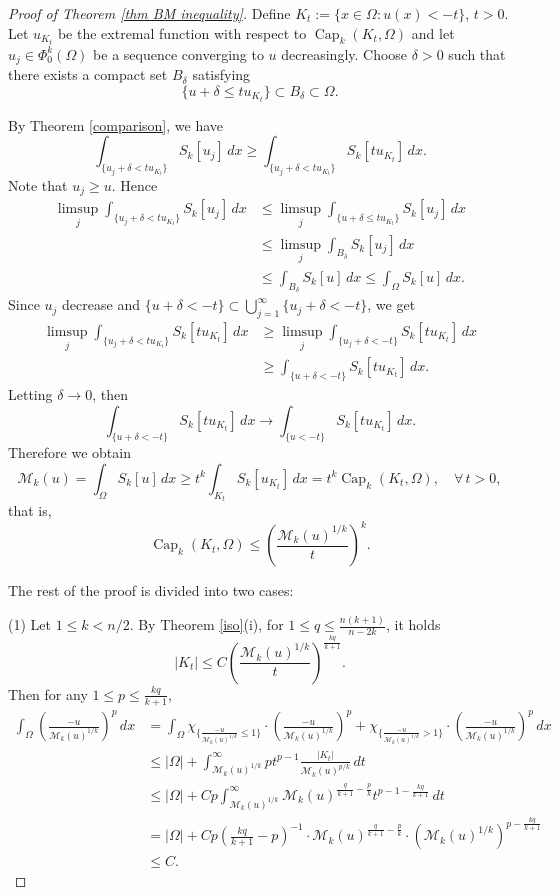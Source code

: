 \documentclass[11pt]{amsart}
\numberwithin{equation}{section}
\numberwithin{equation}{section}
\begin{document}
\begin{proof} [Proof of Theorem \ref{thm BM inequality}] 
	Define $K_{t}:=\{x\in \Omega : u(x)<-t\}$, $t>0$.  Let $u_{K_t}$ be the extremal function with respect to $\operatorname{Cap}_{k}(K_{t},\Omega)$ and let $u_j \in \Phi_0^k(\Omega)$ be a sequence converging to $u$ decreasingly. Choose $\delta>0$ such that there exists a compact set $B_{\delta}$ satisfying 
	\[\{u+\delta \le tu_{K_t}\}\subset B_{\delta}\subset \Omega.\]
	
	By Theorem \ref{comparison}, we have
	\[
	\int_{\{u_j+\delta<tu_{K_t}\}}S_k[u_j]\,dx\geq \int_{\{u_j+\delta<tu_{K_t}\}}S_k[tu_{K_{t}}]\,dx.
	\]
	Note that $u_j\ge u$. Hence
	\begin{align*}
		\limsup_j	\int_{\{u_j+\delta<tu_{K_t}\}}S_k[u_j]\,dx
		&\le \limsup_j\int_{\{u+\delta\le tu_{K_t}\}}S_k[u_j]\,dx\\
		&\le  \limsup_j\int_{B_\delta}S_k[u_j]\,dx\\
		&\le \int_{B_\delta}S_k[u]\,dx\le \int_{\Omega}S_k[u]\,dx.
	\end{align*}
	Since $u_j$ decrease and $\{u+\delta<-t\}\subset \bigcup_{j=1}^{\infty}\{u_j+\delta<-t\}$,  we get
	\begin{align*}
		\limsup_j\int_{\{u_j+\delta<tu_{K_t}\}}S_k[tu_{K_{t}}]\,dx
		&\ge  \limsup_j\int_{\{u_j+\delta<-t\}}S_k[tu_{K_{t}}]\,dx\\
		&\ge \int_{\{u+\delta<-t\}}S_k[tu_{K_{t}}]\,dx.
	\end{align*}
	Letting $\delta\to 0$, then 
	\[\int_{\{u+\delta<-t\}}S_k[tu_{K_{t}}]\,dx \to \int_{\{u<-t\}}S_k[tu_{K_{t}}]\,dx.\]
	Therefore we obtain
	\[
	\mathcal M_k(u)=\int_{\Omega}S_k[u]\,dx\geq t^{k}\int_{K_t}S_k[u_{K_{t}}]\,dx=t^{k}\operatorname{Cap}_{k}(K_{t},\Omega),\quad \forall\,t>0,
	\]
	that is,
	\begin{equation}\label{iso-cap}
		\operatorname{Cap}_k(K_t,\Omega)\leq \left(\frac{\mathcal M_k(u)^{1/k}}{t}\right)^k.
	\end{equation}

The rest of the proof is divided into two cases:

(1) Let $1\leq k<n/2$. 
By Theorem \ref{iso}(i), for  $1\leq q \leq \frac{n(k+1)}{n-2k}$, it holds
\[
|K_t| \leq C\left(\frac{\mathcal M_k(u)^{1/k}}{t}\right)^{\frac{kq}{k+1}}.
\]
Then for any $1\leq p \leq \frac{kq}{k+1}$,
\begin{align*}
	\int_{\Omega}\left(\frac{-u}{\mathcal M_k(u)^{1/k}}\right)^p\,dx
	&=\int_{\Omega}\chi_{ \{\frac{-u}{\mathcal M_k(u)^{1/k}} \leq 1\}}\cdot \left(\frac{-u}{\mathcal M_k(u)^{1/k}}\right)^p+\chi_{\{\frac{-u}{\mathcal M_k(u)^{1/k}}> 1\}} \cdot \left(\frac{-u}{\mathcal M_k(u)^{1/k}}\right)^p\,dx\\
	&\leq |\Omega|+\int_{\mathcal M_k(u)^{1/k}}^{\infty}pt^{p-1}\frac{|K_t|}{\mathcal M_k(u)^{p/k}}\,dt\\
	&\leq |\Omega|+Cp\int_{\mathcal M_k(u)^{1/k}}^{\infty}\mathcal M_k(u)^{\frac{q}{k+1}-\frac{p}{k}} t^{p-1-\frac{kq}{k+1}}\, dt\\ 
	&=|\Omega|+Cp\left(\frac{kq}{k+1}-p\right)^{-1}\cdot\mathcal M_k(u)^{\frac{q}{k+1}-\frac{p}{k}} \cdot (\mathcal M_k(u)^{1/k})^{p-\frac{kq}{k+1}}\\
	&\leq C.
\end{align*}


\end{proof}
\end{document}
